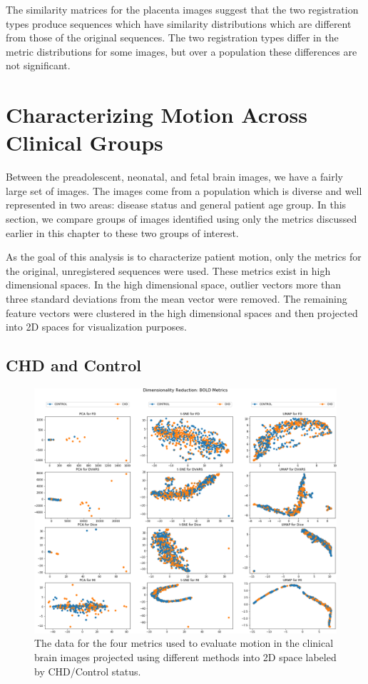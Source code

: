 The similarity matrices for the placenta images suggest that the two registration types produce sequences which have similarity distributions which are different from those of the original sequences. The two registration types differ in the metric distributions for some images, but over a population these differences are not significant.

\section{Characterizing Motion Across Clinical Groups}

Between the preadolescent, neonatal, and fetal brain images, we have a fairly large set of images. The images come from a population which is diverse and well represented in two areas: disease status and general patient age group. In this section, we compare groups of images identified using only the metrics discussed earlier in this chapter to these two groups of interest. 

As the goal of this analysis is to characterize patient motion, only the metrics for the original, unregistered sequences were used. These metrics exist in high dimensional spaces. In the high dimensional space, outlier vectors more than three standard deviations from the mean vector were removed. The remaining feature vectors were clustered in the high dimensional spaces and then projected into 2D spaces for visualization purposes.

\subsection{CHD and Control}

\begin{figure}
\centering
\includegraphics[width=1.0\textwidth]{6/figures/bold-2d-all-cohort.png}
\caption{The data for the four metrics used to evaluate motion in the clinical brain images projected using different methods into 2D space labeled by CHD/Control status.}
\label{fig:mocha-cohorts-data-2d}
\end{figure}

